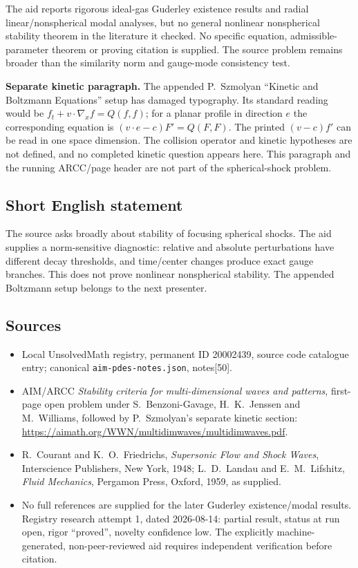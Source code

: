 \documentclass[11pt]{article}
\begin{document}
The aid reports rigorous ideal-gas Guderley existence results and radial linear/nonspherical modal analyses, but no general nonlinear nonspherical stability theorem in the literature it checked. No specific equation, admissible-parameter theorem or proving citation is supplied. The source problem remains broader than the similarity norm and gauge-mode consistency test.

\textbf{Separate kinetic paragraph.} The appended P.~Szmolyan ``Kinetic and Boltzmann Equations'' setup has damaged typography. Its standard reading would be $f_t+v\cdot\nabla_x f=Q(f,f)$; for a planar profile in direction $e$ the corresponding equation is $(v\cdot e-c)F'=Q(F,F)$. The printed $(v-c)f'$ can be read in one space dimension. The collision operator and kinetic hypotheses are not defined, and no completed kinetic question appears here. This paragraph and the running ARCC/page header are not part of the spherical-shock problem.
\subsection{Short English statement}
The source asks broadly about stability of focusing spherical shocks. The aid supplies a norm-sensitive diagnostic: relative and absolute perturbations have different decay thresholds, and time/center changes produce exact gauge branches. This does not prove nonlinear nonspherical stability. The appended Boltzmann setup belongs to the next presenter.
\subsection{Sources}
\begin{itemize}
\item Local UnsolvedMath registry, permanent ID 20002439, source code catalogue entry; canonical \texttt{aim-pdes-notes.json}, notes[50].
\item AIM/ARCC \emph{Stability criteria for multi-dimensional waves and patterns}, first-page open problem under S.~Benzoni-Gavage, H.~K.~Jenssen and M.~Williams, followed by P.~Szmolyan's separate kinetic section: \url{https://aimath.org/WWN/multidimwaves/multidimwaves.pdf}.
\item R.~Courant and K.~O.~Friedrichs, \emph{Supersonic Flow and Shock Waves}, Interscience Publishers, New York, 1948; L.~D.~Landau and E.~M.~Lifshitz, \emph{Fluid Mechanics}, Pergamon Press, Oxford, 1959, as supplied.
\item No full references are supplied for the later Guderley existence/modal results. Registry research attempt 1, dated 2026-08-14: partial result, status at run open, rigor ``proved'', novelty confidence low. The explicitly machine-generated, non-peer-reviewed aid requires independent verification before citation.
\end{itemize}
\end{document}
